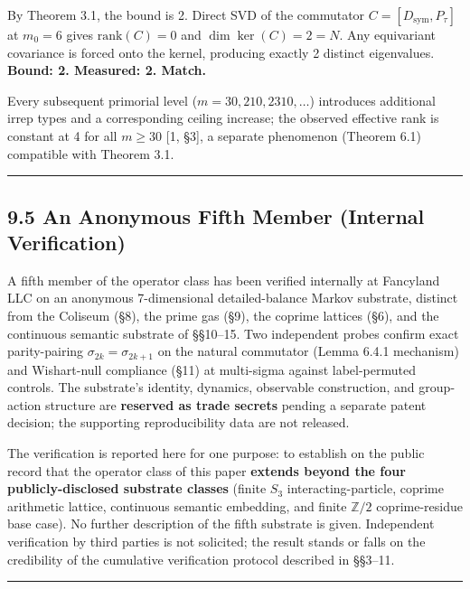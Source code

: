 \documentclass[
  11pt,
]{article}
\begin{document}
By Theorem 3.1, the bound is 2. Direct SVD of the commutator
\(C = [D_\text{sym}, P_\tau]\) at \(m_0 = 6\) gives
\(\mathrm{rank}(C) = 0\) and \(\dim\ker(C) = 2 = N\). Any equivariant
covariance is forced onto the kernel, producing exactly 2 distinct
eigenvalues. \textbf{Bound: 2. Measured: 2. Match.}

Every subsequent primorial level (\(m = 30, 210, 2310, \ldots\))
introduces additional irrep types and a corresponding ceiling increase;
the observed effective rank is constant at 4 for all \(m \geq 30\) {[}1,
§3{]}, a separate phenomenon (Theorem 6.1) compatible with Theorem 3.1.

\begin{center}\rule{0.5\linewidth}{0.5pt}\end{center}

\subsection{9.5 An Anonymous Fifth Member (Internal
Verification)}\label{an-anonymous-fifth-member-internal-verification}

A fifth member of the operator class has been verified internally at
Fancyland LLC on an anonymous 7-dimensional detailed-balance Markov
substrate, distinct from the Coliseum (§8), the prime gas (§9), the
coprime lattices (§6), and the continuous semantic substrate of
§§10--15. Two independent probes confirm exact parity-pairing
\(\sigma_{2k} = \sigma_{2k+1}\) on the natural commutator (Lemma 6.4.1
mechanism) and Wishart-null compliance (§11) at multi-sigma against
label-permuted controls. The substrate's identity, dynamics, observable
construction, and group-action structure are \textbf{reserved as trade
secrets} pending a separate patent decision; the supporting
reproducibility data are not released.

The verification is reported here for one purpose: to establish on the
public record that the operator class of this paper \textbf{extends
beyond the four publicly-disclosed substrate classes} (finite \(S_3\)
interacting-particle, coprime arithmetic lattice, continuous semantic
embedding, and finite \(\mathbb{Z}/2\) coprime-residue base case). No
further description of the fifth substrate is given. Independent
verification by third parties is not solicited; the result stands or
falls on the credibility of the cumulative verification protocol
described in §§3--11.

\begin{center}\rule{0.5\linewidth}{0.5pt}\end{center}
\end{document}
